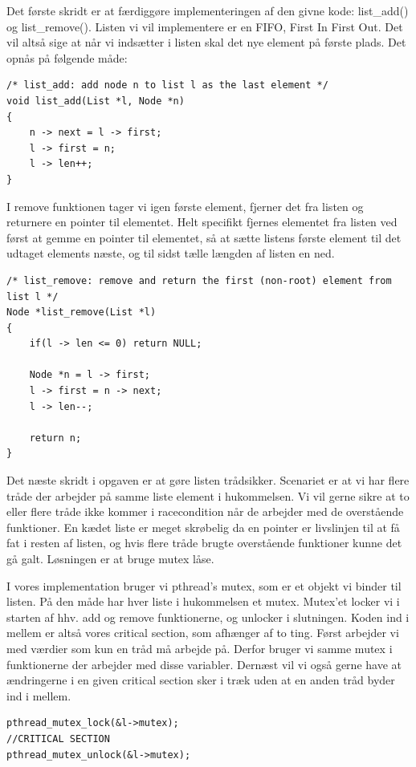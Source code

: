 \documentclass[danish]{report}
\begin{document}
Det første skridt er at færdiggøre implementeringen af den givne kode: list_add() og list_remove(). Listen vi vil implementere er en FIFO, First In First Out. Det vil altså sige at når vi indsætter i listen skal det nye element på første plads. Det opnås på følgende måde:

\begin{lstlisting}    
/* list_add: add node n to list l as the last element */
void list_add(List *l, Node *n)
{
	n -> next = l -> first;
	l -> first = n;
	l -> len++;
}
\end{lstlisting}

I remove funktionen tager vi igen første element, fjerner det fra listen og returnere en pointer til elementet. Helt specifikt fjernes elementet fra listen ved først at gemme en pointer til elementet, så at sætte listens første element til det udtaget elements næste, og til sidst tælle længden af listen en ned.

\begin{lstlisting}    
/* list_remove: remove and return the first (non-root) element from list l */
Node *list_remove(List *l)
{
	if(l -> len <= 0) return NULL;

	Node *n = l -> first;
	l -> first = n -> next;
	l -> len--;

	return n;
}
\end{lstlisting}

Det næste skridt i opgaven er at gøre listen trådsikker. Scenariet er at vi har flere tråde der arbejder på samme liste element i hukommelsen. Vi vil gerne sikre at to eller flere tråde ikke kommer i racecondition når de arbejder med de overstående funktioner. En kædet liste er meget skrøbelig da en pointer er livslinjen til at få fat i resten af listen, og hvis flere tråde brugte overstående funktioner kunne det gå galt. Løsningen er at bruge mutex låse.

I vores implementation bruger vi pthread's mutex, som er et objekt vi binder til listen. På den måde har hver liste i hukommelsen et mutex. Mutex'et locker vi i starten af hhv. add og remove funktionerne, og unlocker i slutningen. Koden ind i mellem er altså vores critical section, som afhænger af to ting. Først arbejder vi med værdier som kun en tråd må arbejde på. Derfor bruger vi samme mutex i funktionerne der arbejder med disse variabler. Dernæst vil vi også gerne have at ændringerne i en given critical section sker i træk uden at en anden tråd byder ind i mellem.


\begin{lstlisting}    
pthread_mutex_lock(&l->mutex);
//CRITICAL SECTION
pthread_mutex_unlock(&l->mutex);
\end{lstlisting}
\end{document}
